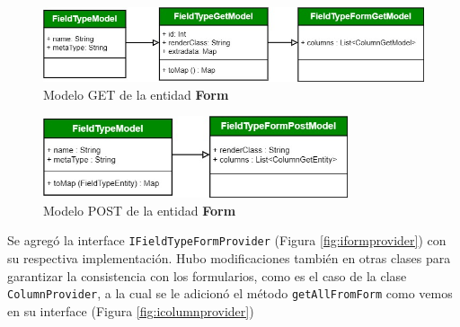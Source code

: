 \documentclass[12pt, a4paper]{book}
\begin{document}
\begin{figure}[H]
  \centering
  \includegraphics[width=1.0\textwidth]{images/form_get_model.jpg}
  \caption{Modelo GET de la entidad \textbf{Form}}
  \label{fig:formgetmodel}
\end{figure}
\begin{figure}[H]
    \centering
    \includegraphics[width=0.8\textwidth]{images/form_post_model.jpg}
    \caption{Modelo POST de la entidad \textbf{Form}}
    \label{fig:formpostmodel}
\end{figure}

Se agregó la interface \texttt{IFieldTypeFormProvider} (Figura \ref{fig:iformprovider}) con su respectiva implementación. Hubo modificaciones también en otras clases para garantizar la consistencia con los formularios, como es el caso de la clase \texttt{ColumnProvider}, a la cual se le adicionó el método \texttt{getAllFromForm} como vemos en su interface (Figura \ref{fig:icolumnprovider})
\end{document}
